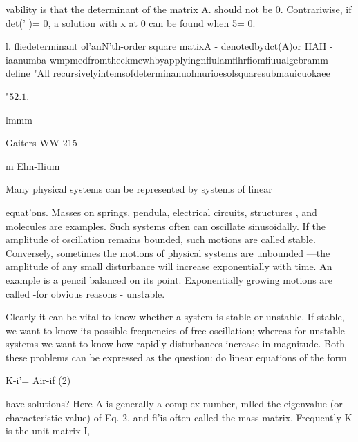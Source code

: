 vability is that the determinant of the matrix A. should not be 0.
Contrariwise, if det(' )= 0, a solution with x at 0 can be found
when 5= 0.

 

 

l. fliedeterminant ol'anN'th-order square matixA - denotedbydct(A)or HAII - iaanumba
wmpmedfromtheekmewhbyapplyingnflulamflhrfiomfiuualgebramm
define "All recursivelyintemsofdeterminanuolmurioesolsquaresubmauicuokaee

"$52.1.$

lmmm

Gaiters-WW 215

m Elm-Ilium

Many physical systems can be represented by systems of linear

equat'ons. Masses on springs, pendula, electrical circuits,
structures , and molecules are examples. Such systems often can
oscillate sinusoidally. If the amplitude of oscillation remains
bounded, such motions are called stable. Conversely, sometimes
the motions of physical systems are unbounded —the amplitude
of any small disturbance will increase exponentially with time. An
example is a pencil balanced on its point. Exponentially growing
motions are called -for obvious reasons - unstable.

Clearly it can be vital to know whether a system is stable or
unstable. If stable, we want to know its possible frequencies of
free oscillation; whereas for unstable systems we want to know
how rapidly disturbances increase in magnitude. Both these
problems can be expressed as the question: do linear equations
of the form

K-i'= Air-if (2)

have solutions? Here A is generally a complex number, mllcd the
eigenvalue (or characteristic value) of Eq. 2, and fi'is often called
the mass matrix. Frequently K is the unit matrix I,

